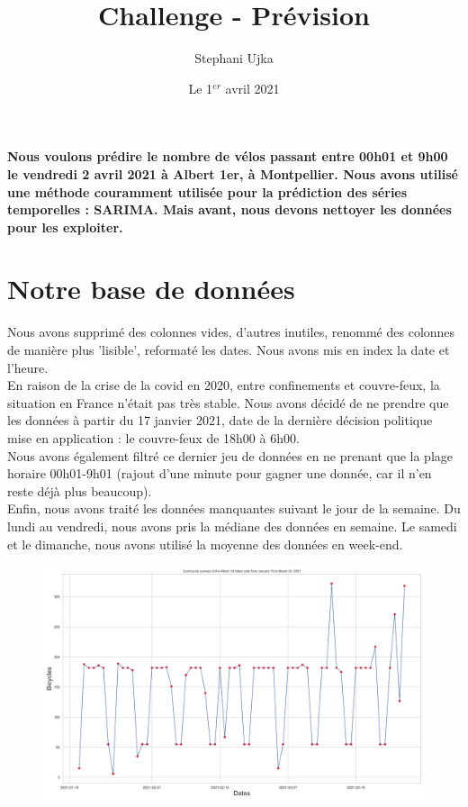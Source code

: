 \documentclass{article}
\title{Challenge - Prévision}
\author{Stephani Ujka}
\date{Le 1$^{er}$ avril 2021}
\begin{document}
\maketitle

\paragraph{Nous voulons prédire le nombre de vélos passant entre 00h01 et 9h00 le vendredi 2 avril 2021 à Albert 1er, à Montpellier. Nous avons utilisé une méthode couramment utilisée pour la prédiction des séries temporelles : SARIMA. Mais avant, nous devons nettoyer les données pour  les exploiter.}

\section{Notre base de données}

Nous avons supprimé des colonnes vides, d'autres inutiles, renommé des colonnes de manière plus 'lisible', reformaté les dates. Nous avons mis en index la date et l'heure.\\

En raison de la crise de la covid en 2020, entre confinements et couvre-feux, la situation en France n'était pas très stable. Nous avons décidé de ne prendre que les données à partir du 17 janvier 2021, date de la dernière décision politique mise en application : le couvre-feux de 18h00 à 6h00.\\
Nous avons également filtré ce dernier jeu de données en ne prenant que la plage horaire 00h01-9h01 (rajout d'une minute pour gagner une donnée, car il n'en reste déjà plus beaucoup).\\
Enfin, nous avons traité les données manquantes suivant le jour de la semaine. Du lundi au vendredi, nous avons pris la médiane des données en semaine. Le samedi et le dimanche, nous avons utilisé la moyenne des données en week-end.
\begin{figure}[h]
    \centering
    \includegraphics[scale=0.5]{data1.png}
\end{figure}
\newpage
\end{document}
